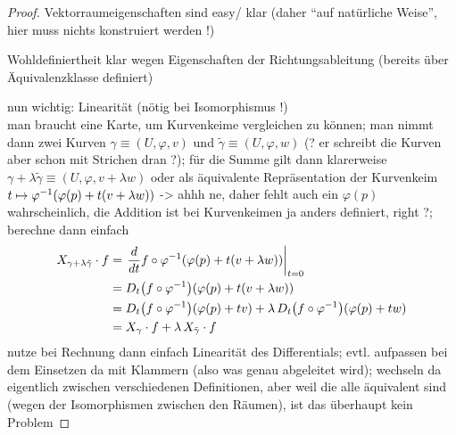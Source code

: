 \documentclass[../H_Analysis_main.tex]{subfiles}
\begin{document}
\begin{proof}
Vektorraumeigenschaften sind easy/ klar (daher \enquote{auf natürliche Weise}, hier muss nichts konstruiert werden !)

Wohldefiniertheit klar wegen Eigenschaften der Richtungsableitung (bereits über Äquivalenzklasse definiert)


nun wichtig: Linearität (nötig bei Isomorphismus !)\\
man braucht eine Karte, um Kurvenkeime vergleichen zu können; man nimmt dann zwei Kurven $\gamma \equiv (U, \varphi, v)$ und $\tilde{\gamma} \equiv (U, \varphi, w)$ (? er schreibt die Kurven aber schon mit Strichen dran ?); für die Summe gilt dann klarerweise $\gamma + \lambda \tilde{\gamma} \equiv (U, \varphi, v + \lambda w)$ oder als äquivalente Repräsentation der Kurvenkeim $t \mapsto \varphi^{-1}\qty(\varphi(p) + t (v + \lambda w))$ -> ahhh ne, daher fehlt auch ein $\varphi(p)$ wahrscheinlich, die Addition ist bei Kurvenkeimen ja anders definiert, right ?; berechne dann einfach 
\begin{align*}
X_{\gamma + \lambda \tilde{\gamma}} \cdot f &= \eval{\dv{t} f \circ \varphi^{-1} \qty(\varphi(p) + t (v + \lambda w))}_{t = 0}
\\
&= D_t \qty(f \circ \varphi^{-1})\qty(\varphi(p) + t (v + \lambda w))
\\
&= D_t \qty(f \circ \varphi^{-1})\qty(\varphi(p) + t v) + \lambda \, D_t \qty(f \circ \varphi^{-1})\qty(\varphi(p) + t w)
\\
&= X_{\gamma} \cdot f + \lambda \,  X_{\tilde{\gamma}} \cdot f
\end{align*}
nutze bei Rechnung dann einfach Linearität des Differentials; evtl. aufpassen bei dem Einsetzen da mit Klammern (also was genau abgeleitet wird); wechseln da eigentlich zwischen verschiedenen Definitionen, aber weil die alle äquivalent sind (wegen der Isomorphismen zwischen den Räumen), ist das überhaupt kein Problem



\end{proof}
\end{document}
